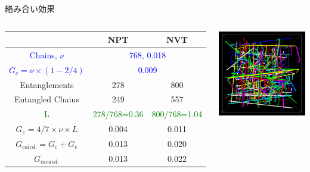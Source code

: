 \documentclass[12pt, dvipdfmx]{beamer}
\begin{document}
\begin{frame}
\begin{alertblock}{絡み合い効果}
	\end{alertblock}
	\vspace{-2mm}
	\begin{columns}[onlytextwidth]
		\scriptsize
		\begin{center}
			\begin{tabular}{c|c|c} \hline
				&NPT & NVT \\ \hline \hline
				\textcolor{blue}{Chains, $\nu$} & \multicolumn{2}{|c}{\textcolor{blue}{768, 0.018}}\\ \hline
				\textcolor{blue}{$G_c = \nu \times (1-2/4)$}&\multicolumn{2}{|c}{\textcolor{blue}{0.009}} \\ \hline \hline
				Entanglements& 278& 800\\ \hline
				Entangled Chains&249&557 \\ \hline
				\textcolor{green}{L} & \textcolor{green}{278/768=0.36} & \textcolor{green}{800/768=1.04} \\ \hline
				$G_e=4/7 \times \nu \times L $ & 0.004 & 0.011 \\ \hline \hline
				\alert{$G_{calcd.}=G_c + G_e$} & \alert{0.013} & \alert{0.020} \\ \hline \hline
				$G_{measd.}$ & 0.013 & 0.022 \\ \hline
			\end{tabular}
		\end{center}
			\centering
			\includegraphics[width=.75\textwidth]{z_cord_NPT_4Chain.png}

\end{columns}
\end{frame}
\end{document}
